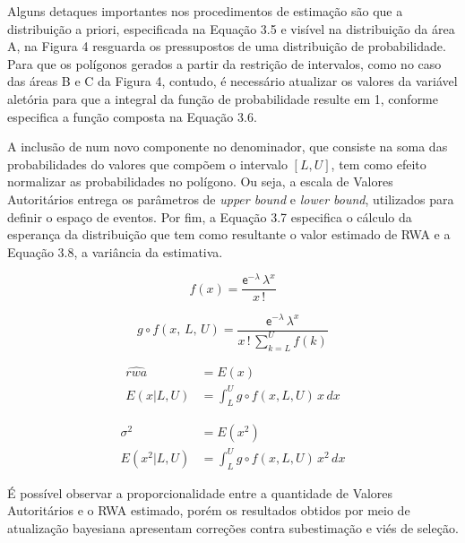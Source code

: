 \documentclass[
12pt,				%
openright,			%
twoside,			%
a4paper,			%
english,			%
french,				%
spanish,			%
brazil				%
]{abntex2}
\begin{document}
Alguns detaques importantes nos procedimentos de estimação são que a distribuição a priori, especificada na Equação 3.5 e visível na distribuição da área A, na Figura 4 resguarda os pressupostos de uma distribuição de probabilidade. Para que os polígonos gerados a partir da restrição de intervalos, como no caso das áreas B e C da Figura 4, contudo, é necessário atualizar os valores da variável aletória para que a integral da função de probabilidade resulte em 1, conforme especifica a função composta na Equação 3.6. 

A inclusão de num novo componente no denominador, que consiste na soma das probabilidades do valores que compõem o intervalo $[L, U]$, tem como efeito normalizar as probabilidades no polígono. Ou seja, a escala de Valores Autoritários entrega os parâmetros de \emph{upper bound} e \emph{lower bound}, utilizados para definir o espaço de eventos. Por fim, a Equação 3.7 especifica o cálculo da esperança da distribuição que tem como resultante o valor estimado de RWA e a Equação 3.8, a variância da estimativa. 
     

\begin{equation}
f(x) = \frac{\mathsf{e^{-\lambda}} \,\lambda^{x}}{x\,!}
\end{equation}

\begin{equation}
g \circ f(x,\, L, \,U) =\frac{\mathsf{e^{-\lambda}} \,\lambda^{x}}{x\,! \, \displaystyle\sum_{k = L}^{U} f(k)}
\end{equation}

\begin{equation} \label{eq1}
\begin{split}
\widehat{rwa} & = E(x) \\
E(x|L, U) & = \int_{L}^{U} g \circ f(x, L, U) \,x \,dx
\end{split}
\end{equation}

\begin{equation}
\begin{split}
\sigma^{2} & = E(x^{2}) \\
E(x^{2}|L, U) & = \int_{L}^{U} g \circ f(x, L, U) \,x^{2} \,dx
\end{split}
\end{equation}

É possível observar a proporcionalidade entre a quantidade de Valores Autoritários e o RWA estimado, porém os resultados obtidos por meio de atualização bayesiana apresentam correções contra subestimação e viés de seleção.
\end{document}

